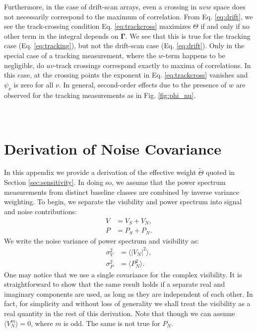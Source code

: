 \documentclass[twocolumn,apj,numberedappendix]{emulateapj}
\renewcommand\[{\begin{equation}}
\renewcommand\]{\end{equation}}
\begin{document}
Furthermore, in the case of drift-scan arrays, even a crossing in $uvw$ space does not necessarily correspond to the maximum of correlation. From Eq. \eqref{eq:drift}, we see the track-crossing condition Eq. \eqref{eq:trackcross} maximizes $\Theta$ if and only if no other term in the integral depends on $\boldsymbol{\Gamma}$. We see that this is true for the tracking case (Eq. \eqref{eq:tracking}), but not the drift-scan case (Eq. \eqref{eq:drift}). Only in the special case of a tracking measurement, where the $w$-term happens to be negligible, do $uv$-track crossings correspond exactly to maxima of correlations. In this case, at the crossing points the exponent in Eq. \eqref{eq:trackcross} vanishes and $\psi_\nu$ is zero for all $\nu$. In general, second-order effects due to the presence of $w$ are observed for the tracking measurements as in Fig. \ref{fig:phi_nu}. 


\section{\label{sec:appB}\\Derivation of Noise Covariance \label{sec:appB}}
\label{sec:appB}
In this appendix we provide a derivation of the effective weight $\widetilde{\Theta}$ quoted in Section \ref{sec:sensitivity}. In doing so, we assume that the power spectrum measurements from distinct baseline classes are combined by inverse variance weighting. To begin, we separate the visibility and power spectrum into signal and noise contributions:
\begin{equation}
\begin{aligned}
V &= V_S+V_N,\\
P &= P_S+P_N.
\end{aligned}
\end{equation}
We write the noise variance of power spectrum and visibility as:
\begin{equation}
\begin{aligned}
\sigma_V^2 &= \langle |V_N|^2 \rangle,\\
\sigma_P^2 &= \langle P_N^2 \rangle.
\end{aligned}
\end{equation}
One may notice that we use a single covariance for the complex visibility. It is straightforward to show that the same result holds if a separate real and imaginary components are used, as long as they are independent of each other. In fact, for simplicity and without loss of generality we shall treat the visibility as a real quantity in the rest of this derivation. 
Note that though we can assume $\langle V_N^{m}\rangle=0$, where $m$ is odd. The same is not true for $P_N$. 
\end{document}
